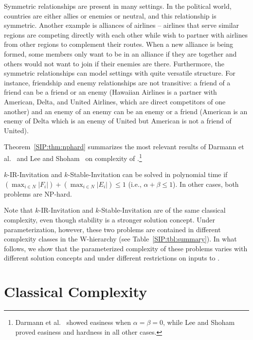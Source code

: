 Symmetric relationships are present in many settings. In the political world, countries are either allies or enemies or neutral, and this relationship is symmetric. Another example is alliances of airlines -- airlines that serve similar regions are competing directly with each other while wish to partner with airlines from other regions to complement their routes. When a new alliance is being formed, some members only want to be in an alliance if they are together and others would not want to join if their enemies are there. Furthermore, the symmetric relationships can model settings with quite versatile structure. For instance, friendship and enemy relationships are not transitive: a friend of a friend can be a friend or an enemy (Hawaiian Airlines is a partner with American, Delta, and United Airlines, which are direct competitors of one another) and an enemy of an enemy can be an enemy or a friend (American is an enemy of Delta which is an enemy of United but American is not a friend of United). 


Theorem~\ref{SIP:thm:nphard} summarizes the most relevant results of Darmann et al.~\cite{GASP12WINE} and Lee and Shoham~\cite{LEE15AAAI} on complexity of \SIPs.\footnote{
Darmann et al.~\cite{GASP12WINE} showed easiness when $\alpha=\beta=0$, while Lee and Shoham~\cite{LEE15AAAI} proved easiness and hardness in all other cases.}
\begin{theorem} \label{SIP:thm:nphard} 
	$k$-IR-Invitation and $k$-Stable-Invitation can be solved in polynomial time if $(\max_{i \in N} |F_i|) + (\max_{i \in N} |E_i|) \leq 1$ (i.e., $\alpha + \beta \leq 1$). In other cases, both problems are NP-hard.
\end{theorem}
Note that $k$-IR-Invitation and $k$-Stable-Invitation are of the same classical complexity, even though stability is a stronger solution concept. Under parameterization, however, these two problems are contained in different complexity classes in the W-hierarchy (see Table~\ref{SIP:tbl:summary}).
In what follows, we show that the parameterized complexity of these problems varies with different solution concepts and under different restrictions on inputs to \SIP.


\section{Classical Complexity} \label{SIP:sec:prelim}

